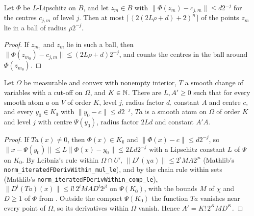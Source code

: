 \begin{lemma}
\label{lem:transported-centres}
\leanok
{}
Let $\Phi$ be $L$-Lipschitz on $B$, and let $z_m \in B$ with
$\|\Phi(z_m) - c_{j,m}\| \leq d 2^{-j}$ for the centres $c_{j,m}$ of level $j$. Then at most
$\lceil (2(2L\rho + d) + 2)^n \rceil$ of the points $z_m$ lie in a ball of radius $\rho 2^{-j}$.
\end{lemma}

\begin{proof}
\leanok
If $z_{m_0}$ and $z_m$ lie in such a ball, then
$\|\Phi(z_{m_0}) - c_{j,m}\| \leq (2L\rho + d) 2^{-j}$, and  counts the
centres in the ball around $\Phi(z_{m_0})$.
\end{proof}

\begin{theorem}
\label{thm:smooth-atoms-change-of-variables}
\leanok
{}
Let $\Omega$ be measurable and convex with nonempty interior, $T$ a smooth change of variables
with a cut-off on $\Omega$, and $K \in \mathbb{N}$. There are $L, A' \geq 0$ such that for every smooth
atom $a$ on $V$ of order $K$, level $j$, radius factor $d$, constant $A$ and centre $c$, and every
$y_0 \in K_0$ with $\|y_0 - c\| \leq d 2^{-j}$, $T a$ is a smooth atom on $\Omega$ of order $K$
and level $j$ with centre $\Psi(y_0)$, radius factor $2Ld$ and constant $A' A$.
\end{theorem}

\begin{proof}
\leanok
If $T a(x) \neq 0$, then $\Phi(x) \in K_0$ and $\|\Phi(x) - c\| \leq d 2^{-j}$, so
$\|x - \Psi(y_0)\| \leq L \|\Phi(x) - y_0\| \leq 2 L d 2^{-j}$ with a Lipschitz constant $L$ of
$\Psi$ on $K_0$. By Leibniz's rule within $\Omega \cap U'$,
$\|D^i (\chi a)\| \leq 2^i M A 2^{ji}$ (Mathlib's \texttt{norm\_iteratedFDerivWithin\_mul\_le}),
and by the chain rule within sets (Mathlib's \texttt{norm\_iteratedFDerivWithin\_comp\_le}),
$\|D^l (T a)(x)\| \leq l!\, 2^l M A D^l 2^{jl}$ on $\Psi(K_0)$, with the bounds $M$ of $\chi$ and
$D \geq 1$ of $\Phi$ from . Outside the compact $\Psi(K_0)$ the
function $T a$ vanishes near every point of $\Omega$, so its derivatives within $\Omega$ vanish.
Hence $A' = K!\, 2^K M D^K$.
\end{proof}

